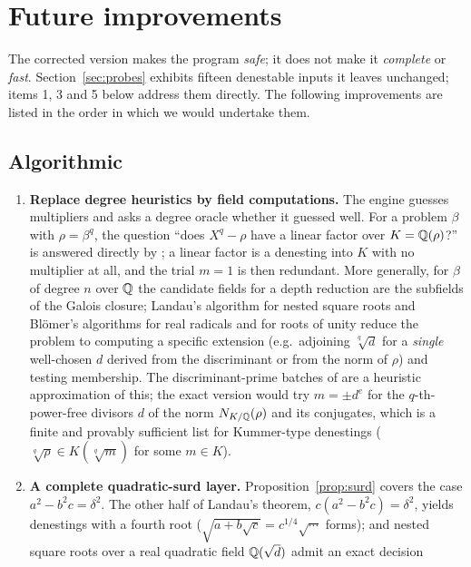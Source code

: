 \section{Future improvements}
\label{sec:future}
The corrected version makes the program \emph{safe}; it does not make it
\emph{complete} or \emph{fast}. Section~\ref{sec:probes} exhibits fifteen
denestable inputs it leaves unchanged; items 1, 3 and 5 below address them
directly. The following improvements are listed in the order in which we
would undertake them.

\subsection{Algorithmic}
\begin{enumerate}
\item \textbf{Replace degree heuristics by field computations.} The engine
      guesses multipliers and asks a degree oracle whether it guessed well.
      For a problem $\beta$ with $\rho=\beta^q$, the question ``does
      $X^q-\rho$ have a linear factor over $K=\mathbb{Q}(\rho)$?'' is answered directly
      by ; a linear factor is
      a denesting into $K$ with no multiplier at all, and the trial $m=1$ is
      then redundant. More generally, for $\beta$ of degree $n$ over $\mathbb{Q}$ the
      candidate fields for a depth reduction are the subfields of the Galois
      closure; Landau's algorithm for nested square roots and Blömer's
      algorithms for real radicals and for roots of unity reduce the problem
      to computing a specific extension (e.g.\ adjoining $\sqrt[q]{d}$ for a
      \emph{single} well-chosen $d$ derived from the discriminant or from the
      norm of $\rho$) and testing membership. The discriminant-prime batches
      of  are a heuristic approximation of this; the
      exact version would try $m=\pm d^{e}$ for the $q$-th-power-free
      divisors $d$ of the norm $N_{K/\mathbb{Q}}(\rho)$ and its conjugates, which is a
      finite and provably sufficient list for Kummer-type denestings
      ($\sqrt[q]{\rho}\in K(\sqrt[q]{m})$ for some $m\in K$).
\item \textbf{A complete quadratic-surd layer.} Proposition~\ref{prop:surd}
      covers the case $a^2-b^2c=\delta^2$. The other half of Landau's theorem,
      $c(a^2-b^2c)=\delta^2$, yields denestings with a fourth root
      ($\sqrt{a+b\sqrt c}=c^{1/4}\sqrt{\cdots}$ forms); and nested square roots
      over a real quadratic field $\mathbb{Q}(\sqrt d)$ admit an exact decision

\end{enumerate}
